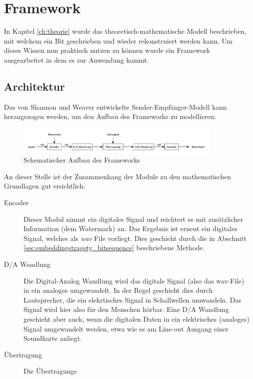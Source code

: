 \chapter{Framework}
\label{ch:methode}

In Kapitel \ref{ch:theorie} wurde das theoretisch-mathematische Modell beschrieben, mit welchem ein Bit geschrieben und wieder rekonstruiert werden kann. Um dieses Wissen nun praktisch nutzen zu können wurde ein Framework ausgearbeitet in dem es zur Anwendung kommt. 

\section{Architektur}

Das von Shannon und Weaver entwickelte Sender-Empfänger-Modell \cite{shannon2001mathematical} kann herangezogen werden, um den Aufbau des Frameworks zu modellieren:

\begin{figure}[tb]
	\centering
	\includegraphics[width=0.9\textwidth]{figures/diagram-framework.pdf}
	\caption{Schematischer Aufbau des Frameworks}
	\label{fig:diagram-framework}
\end{figure}

An dieser Stelle ist der Zusammenhang der Module zu den mathematischen Grundlagen gut ersichtlich:

\begin{description}

\item[Encoder] 
Dieses Modul nimmt ein digitales Signal und reichtert es mit zusätzlicher Information (dem Watermark) an. Das Ergebnis ist erneut ein digitales Signal, welches als \textit{wav} File vorliegt. Dies geschieht durch die in Abschnitt \ref{sec:embeddingstragety_bitsequence} beschriebene Methode. 
\item[D/A Wandlung] 
Die Digital-Analog Wandlung wird das digitale Signal (also das wav-File) in ein analoges umgewandelt. In der Regel geschieht dies durch Lautsprecher, die ein elekrtisches Signal in Schallwellen umwandeln. Das Signal wird hier also für den Menschen hörbar. 
Eine D/A Wandlung geschieht aber auch, wenn die digitalen Daten in ein elektrisches (analoges) Signal umgewandelt werden, etwa wie es am Line-out Ausgang einer Soundkarte anliegt. 
\item[Übertragung] 
Die Übertragungs 


	
\end{description}

